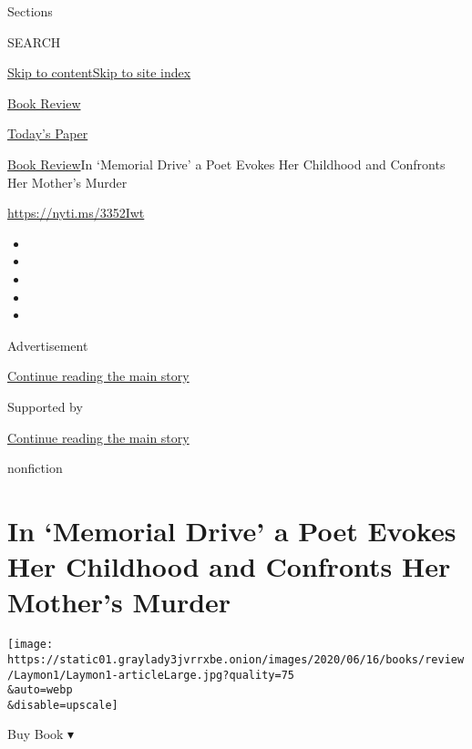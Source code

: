 Sections

SEARCH

\protect\hyperlink{site-content}{Skip to
content}\protect\hyperlink{site-index}{Skip to site index}

\href{https://www.nytimes3xbfgragh.onion/section/books/review}{Book
Review}

\href{https://myaccount.nytimes3xbfgragh.onion/auth/login?response_type=cookie\&client_id=vi}{}

\href{https://www.nytimes3xbfgragh.onion/section/todayspaper}{Today's
Paper}

\href{/section/books/review}{Book Review}\textbar{}In `Memorial Drive' a
Poet Evokes Her Childhood and Confronts Her Mother's Murder

\url{https://nyti.ms/3352Iwt}

\begin{itemize}
\item
\item
\item
\item
\item
\end{itemize}

Advertisement

\protect\hyperlink{after-top}{Continue reading the main story}

Supported by

\protect\hyperlink{after-sponsor}{Continue reading the main story}

nonfiction

\hypertarget{in-memorial-drive-a-poet-evokes-her-childhood-and-confronts-her-mothers-murder}{%
\section{In `Memorial Drive' a Poet Evokes Her Childhood and Confronts
Her Mother's
Murder}\label{in-memorial-drive-a-poet-evokes-her-childhood-and-confronts-her-mothers-murder}}

\texttt{[image: https://static01.graylady3jvrrxbe.onion/images/2020/06/16/books/review/Laymon1/Laymon1-articleLarge.jpg?quality=75\\\&auto=webp\\\&disable=upscale]}

Buy Book ▾

